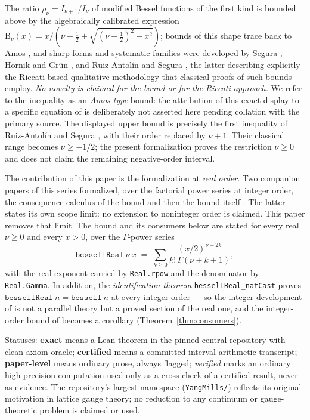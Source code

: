 \documentclass[11pt]{article}
\newcommand{\lean}[1]{\texttt{#1}}
\newcommand{\RHS}{\mathrm{B}}
\begin{document}
The ratio $\rho_\nu = I_{\nu+1}/I_\nu$ of modified Bessel functions
of the first kind is bounded above by the algebraically calibrated
expression $\RHS_\nu(x) = x/(\nu+\tfrac12+\sqrt{(\nu+\tfrac12)^2+x^2})$;
bounds of this shape trace back to Amos \cite{Amos74}, and sharp
forms and systematic families were developed by Segura
\cite{Segura11}, Hornik and Gr\"un \cite{HG13,HG24}, and
Ruiz-Antol\'in and Segura \cite{RS16}, the latter describing
explicitly the Riccati-based qualitative methodology that classical
proofs of such bounds employ.  \emph{No novelty is claimed for the
bound or for the Riccati approach.}  We refer to the inequality as
an \emph{Amos-type} bound: the attribution of this exact display to
a specific equation of \cite{Amos74} is deliberately not asserted
here pending collation with the primary source.
The displayed upper bound is precisely the first inequality of
Ruiz-Antol\'in and Segura \cite[Theorem~2]{RS16}, with their order
replaced by $\nu+1$. Their classical range becomes $\nu\ge-1/2$;
the present formalization proves the restriction $\nu\ge0$ and
does not claim the remaining negative-order interval.

The contribution of this paper is the formalization at
\emph{real order}.  Two companion papers of this series formalized,
over the factorial power series at integer order, the consequence
calculus of the bound \cite{ErikssonC2} and then the bound itself
\cite{ErikssonC3}.  The latter states its own scope limit: no
extension to noninteger order is claimed.  This paper removes that
limit.  The bound and its consumers below are stated for every real
$\nu \ge 0$ and every $x > 0$, over the $\Gamma$-power series
\[
\lean{besselIReal}\ \nu\ x \;=\;
\sum_{k \ge 0} \frac{(x/2)^{\nu+2k}}{k!\,\Gamma(\nu+k+1)},
\]
with the real exponent carried by \lean{Real.rpow} and the
denominator by \lean{Real.Gamma}.  In addition, the
\emph{identification theorem} \lean{besselIReal\_natCast} proves
$\lean{besselIReal}\ n = \lean{besselI}\ n$ at every integer order
--- so the integer development of \cite{ErikssonC2,ErikssonC3} is
not a parallel theory but a proved section of the real one, and the
integer-order bound of \cite{ErikssonC3} becomes a corollary
(Theorem~\ref{thm:consumers}).

Statuses: \textbf{exact} means a Lean theorem in the pinned central
repository with clean axiom oracle; \textbf{certified} means a
committed interval-arithmetic transcript; \textbf{paper-level} means
ordinary prose, always flagged; \emph{verified} marks an ordinary
high-precision computation used only as a cross-check of a certified
result, never as evidence.  The repository's largest namespace
(\lean{YangMills/}) reflects its original motivation in lattice
gauge theory; no reduction to any continuum or gauge-theoretic
problem is claimed or used.
\end{document}
